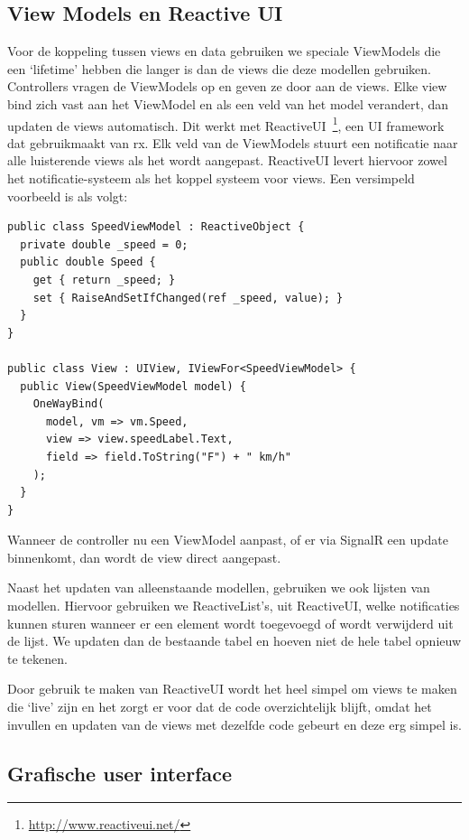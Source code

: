 \subsection{View Models en Reactive UI} 
\label{sec:vm-reactive-ui}

Voor de koppeling tussen views en data gebruiken we speciale ViewModels die een `lifetime' hebben die langer is dan de views die deze modellen gebruiken. Controllers vragen de ViewModels op en geven ze door aan de views. Elke view bind zich vast aan het ViewModel en als een veld van het model verandert, dan updaten de views automatisch. Dit werkt met ReactiveUI~\footnote{\url{http://www.reactiveui.net/}}, een UI framework dat gebruikmaakt van \ac{rx}. Elk veld van de ViewModels stuurt een notificatie naar alle luisterende views als het wordt aangepast. ReactiveUI levert hiervoor zowel het notificatie-systeem als het koppel systeem voor views. Een versimpeld voorbeeld is als volgt:

\begin{verbatim}
public class SpeedViewModel : ReactiveObject {
  private double _speed = 0;
  public double Speed { 
    get { return _speed; }
    set { RaiseAndSetIfChanged(ref _speed, value); }
  }
}

public class View : UIView, IViewFor<SpeedViewModel> {
  public View(SpeedViewModel model) {
    OneWayBind(
      model, vm => vm.Speed, 
      view => view.speedLabel.Text, 
      field => field.ToString("F") + " km/h"
    );
  }
}
\end{verbatim}

Wanneer de controller nu een ViewModel aanpast, of er via SignalR een update binnenkomt, dan wordt de view direct aangepast. 

Naast het updaten van alleenstaande modellen, gebruiken we ook lijsten van modellen. Hiervoor gebruiken we ReactiveList's, uit ReactiveUI, welke notificaties kunnen sturen wanneer er een element wordt toegevoegd of wordt verwijderd uit de lijst. We updaten dan de bestaande tabel en hoeven niet de hele tabel opnieuw te tekenen.

Door gebruik te maken van ReactiveUI wordt het heel simpel om views te maken die `live' zijn en het zorgt er voor dat de code overzichtelijk blijft, omdat het invullen en updaten van de views met dezelfde code gebeurt en deze erg simpel is.

\subsection{Grafische user interface}

